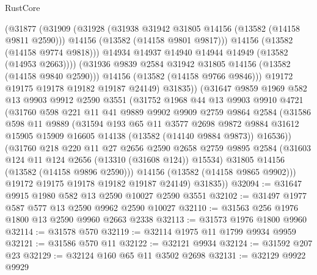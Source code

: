 \begin{lexlean}{RustCore}
\begin{coremodule}
                (@31877
                  (@31909
                    (@31928
                      (@31938 @31942 @31805 @14156 (@13582 (@14158 @9811 @2590)))
                      @14156
                      (@13582 (@14158 @9801 @9817)))
                    @14156
                    (@13582 (@14158 @9774 @9818)))
                  @14934
                  @14937
                  @14940
                  @14944
                  @14949
                  (@13582 (@14953 @2663))))
              (@31936 @9839 @2584 @31942 @31805 @14156 (@13582 (@14158 @9840 @2590)))
              @14156
              (@13582 (@14158 @9766 @9846)))
            @19172
            @19175
            @19178
            @19182
            @19187
            @24149)
          @31835))
      (@31647
        @9859
        @1969
        @582
        @13
        @9903
        @9912
        @2590
        @3551
        (@31752
          @1968
          @44
          @13
          @9903
          @9910
          @4721
          (@31760
            @598
            @221
            @11
            @41
            @9889
            @9902
            @9909
            @2759
            @9864
            @2584
            (@31586
              @598
              @11
              @9889
              (@31594
                @193
                @65
                @11
                @3577
                @2698
                @9872
                @9884
                @31612
                @15905
                @15909
                @16605
                @14138
                (@13582 (@14140 @9884 @9873))
                @16536))
            (@31760
              @218
              @220
              @11
              @27
              @2656
              @2590
              @2658
              @2759
              @9895
              @2584
              (@31603 @124 @11 @124 @2656 (@13310 (@31608 @124)) @15534)
              @31805
              @14156
              (@13582 (@14158 @9896 @2590)))
            @14156
            (@13582 (@14158 @9865 @9902)))
          @19172
          @19175
          @19178
          @19182
          @19187
          @24149)
        @31835))
@32094 := @31647 @9915 @1980 @582 @13 @2590 @10027 @2590 @3551
@32102 := @31497 @1977 @587 @577 @13 @2590 @9962 @2590 @10027
@32110 := @31563 @256 @1976 @1800 @13 @2590 @9960 @2663 @2338
@32113 := @31573 @1976 @1800 @9960
@32114 := @31578 @570
@32119 := @32114 @1975 @11 @1799 @9934 @9959
@32121 := @31586 @570 @11
@32122 := @32121 @9934
@32124 := @31592 @207 @23
@32129 := @32124 @160 @65 @11 @3502 @2698
@32131 := @32129 @9922 @9929

\end{coremodule}
\end{lexlean}
